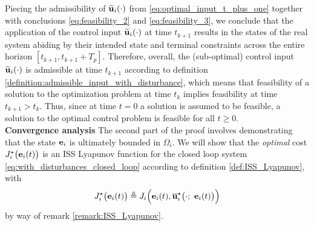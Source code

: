 

Piecing the admissibility of $\widetilde{\bm{\mathbf{u}}}_i(\cdot)$ from
\eqref{eq:optimal_input_t_plus_one} together with conclusions
\eqref{eq:feasibility_2} and \eqref{eq:feasibility_3}, we conclude that the
application of the control input $\widetilde{\bm{\mathbf{u}}}_i(\cdot)$ at time
$t_{k+1}$ results in the states of the real system abiding by their intended
state and terminal constraints across the entire horizon
$[t_{k+1}, t_{k+1} + T_p]$. Therefore, overall, the (sub-optimal) control input
$\widetilde{\bm{\mathbf{u}}}_i(\cdot)$ is admissible at time $t_{k+1}$ according to
definition \eqref{definition:admissible_input_with_disturbance}, which means
that feasibility of a solution to the optimization problem at time $t_k$ implies
feasibility at time $t_{k+1} > t_k$. Thus, since at time $t=0$ a solution is
assumed to be feasible, a solution to the optimal control problem is feasible
for all $t \geq 0$.\\[2.5ex]

\textbf{Convergence analysis}
The second part of the proof involves demonstrating that the
state $\bm{\mathbf{e}}_i$ is ultimately bounded in $\Omega_i$. We will show that the
\textit{optimal} cost $J_i^{\star}\big(\bm{\mathbf{e}}_i(t)\big)$ is an
ISS Lyapunov function for the closed loop system
\eqref{eq:with_disturbances_closed_loop} according to definition
\eqref{def:ISS_Lyapunov}, with
$$J_i^{\star}\big(\vect{e}_i(t)\big) \triangleq J_i \Big(\vect{e}_i(t), \overline{\vect{u}}_i^{\star}\big(\cdot;\ \vect{e}_i(t)\big)\Big)$$
by way of remark \eqref{remark:ISS_Lyapunov}.

